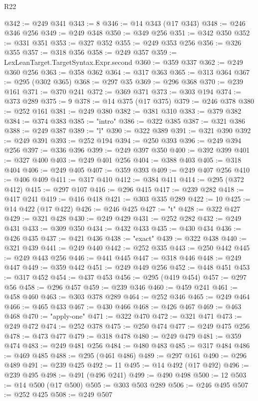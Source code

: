 \begin{lexlean}{R22}
\begin{coremodule}
@342 := @249 @341
@343 := 8
@346 := @14 @343 (@17 @343)
@348 := @246 @346 @256
@349 := @249 @348
@350 := @349 @256
@351 := @342 @350
@352 := @331 @351
@353 := @327 @352
@355 := @249 @353 @256
@356 := @326 @355
@357 := @318 @356
@358 := @249 @357
@359 := LexLeanTarget.TargetSyntax.Expr.second
@360 := @359 @337
@362 := @249 @360 @256
@363 := @358 @362
@364 := @317 @363
@365 := @313 @364
@367 := @295 (@302 @365)
@368 := @297 @35
@369 := @296 @368
@370 := @239 @161
@371 := @370 @241
@372 := @369 @371
@373 := @303 @194
@374 := @373 @289
@375 := 9
@378 := @14 @375 (@17 @375)
@379 := @246 @378
@380 := @252 @161
@381 := @249 @380
@382 := @381 @310
@383 := @379 @382
@384 := @374 @383
@385 := "intro"
@386 := @322 @385
@387 := @321 @386
@388 := @249 @387
@389 := "l"
@390 := @322 @389
@391 := @321 @390
@392 := @249 @391
@393 := @252 @194
@394 := @250 @393
@396 := @249 @394 @256
@397 := @336 @396
@399 := @249 @397 @350
@400 := @392 @399
@401 := @327 @400
@403 := @249 @401 @256
@404 := @388 @403
@405 := @318 @404
@406 := @249 @405
@407 := @359 @393
@409 := @249 @407 @256
@410 := @406 @409
@411 := @317 @410
@412 := @384 @411
@414 := @295 (@372 @412)
@415 := @297 @107
@416 := @296 @415
@417 := @239 @282
@418 := @417 @241
@419 := @416 @418
@421 := @303 @335 @289
@422 := 10
@425 := @14 @422 (@17 @422)
@426 := @246 @425
@427 := "t"
@428 := @322 @427
@429 := @321 @428
@430 := @249 @429
@431 := @252 @282
@432 := @249 @431
@433 := @309 @350
@434 := @432 @433
@435 := @430 @434
@436 := @426 @435
@437 := @421 @436
@438 := "exact"
@439 := @322 @438
@440 := @321 @439
@441 := @249 @440
@442 := @252 @335
@443 := @250 @442
@445 := @249 @443 @256
@446 := @441 @445
@447 := @318 @446
@448 := @249 @447
@449 := @359 @442
@451 := @249 @449 @256
@452 := @448 @451
@453 := @317 @452
@454 := @437 @453
@456 := @295 (@419 @454)
@457 := @297 @56
@458 := @296 @457
@459 := @239 @346
@460 := @459 @241
@461 := @458 @460
@463 := @303 @378 @289
@464 := @252 @346
@465 := @249 @464
@466 := @465 @433
@467 := @430 @466
@468 := @426 @467
@469 := @463 @468
@470 := "apply-one"
@471 := @322 @470
@472 := @321 @471
@473 := @249 @472
@474 := @252 @378
@475 := @250 @474
@477 := @249 @475 @256
@478 := @473 @477
@479 := @318 @478
@480 := @249 @479
@481 := @359 @474
@483 := @249 @481 @256
@484 := @480 @483
@485 := @317 @484
@486 := @469 @485
@488 := @295 (@461 @486)
@489 := @297 @161
@490 := @296 @489
@491 := @239 @425
@492 := 11
@495 := @14 @492 (@17 @492)
@496 := @239 @495
@498 := @491 (@496 @241)
@499 := @490 @498
@500 := 12
@503 := @14 @500 (@17 @500)
@505 := @303 @503 @289
@506 := @246 @495
@507 := @252 @425
@508 := @249 @507

\end{coremodule}
\end{lexlean}
